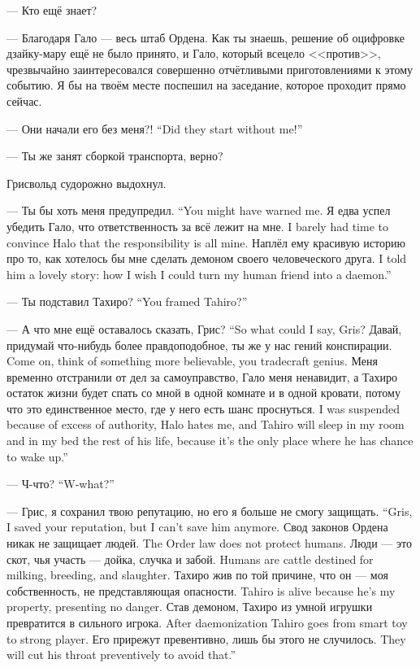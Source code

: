 --- Кто ещё знает?

--- Благодаря Гало --- весь штаб Ордена.
Как ты знаешь, решение об оцифровке дзайку-мару ещё не было принято, и Гало, который всецело <<против>>, чрезвычайно заинтересовался совершенно отчётливыми приготовлениями к этому событию.
Я бы на твоём месте поспешил на заседание, которое проходит прямо сейчас.

{--- Они начали его без меня?!}
{``Did they start without me!''}

--- Ты же занят сборкой транспорта, верно?

Грисвольд судорожно выдохнул.

{--- Ты бы хоть меня предупредил.}
{``You might have warned me.}
{Я едва успел убедить Гало, что ответственность за всё лежит на мне.}
{I barely had time to convince Halo that the responsibility is all mine.}
{Наплёл ему красивую историю про то, как хотелось бы мне сделать демоном своего человеческого друга.}
{I told him a lovely story: how I wish I could turn my human friend into a daemon.''}

{--- Ты подставил Тахиро?}
{``You framed Tahiro?''}

{--- А что мне ещё оставалось сказать, Грис?}
{``So what could I say, Gris?}
{Давай, придумай что-нибудь более правдоподобное, ты же у нас гений конспирации.}
{Come on, think of something more believable, you tradecraft genius.}
{Меня временно отстранили от дел за самоуправство, Гало меня ненавидит, а Тахиро остаток жизни будет спать со мной в одной комнате и в одной кровати, потому что это единственное место, где у него есть шанс проснуться.}
{I was suspended because of excess of authority, Halo hates me, and Tahiro will sleep in my room and in my bed the rest of his life, because it's the only place where he has chance to wake up.''}

{--- Ч-что?}
{``W-what?''}

{--- Грис, я сохранил твою репутацию, но его я больше не смогу защищать.}
{``Gris, I saved your reputation, but I can't save him anymore.}
{Свод законов Ордена никак не защищает людей.}
{The Order law does not protect humans.}
{Люди --- это скот, чья участь --- дойка, случка и забой.}
{Humans are cattle destined for milking, breeding, and slaughter.}
{Тахиро жив по той причине, что он --- моя собственность, не представляющая опасности.}
{Tahiro is alive because he's my property, presenting no danger.}
{Став демоном, Тахиро из умной игрушки превратится в сильного игрока.}
{After daemonization Tahiro goes from smart toy to strong player.}
{Его прирежут превентивно, лишь бы этого не случилось.}
{They will cut his throat preventively to avoid that.''}

